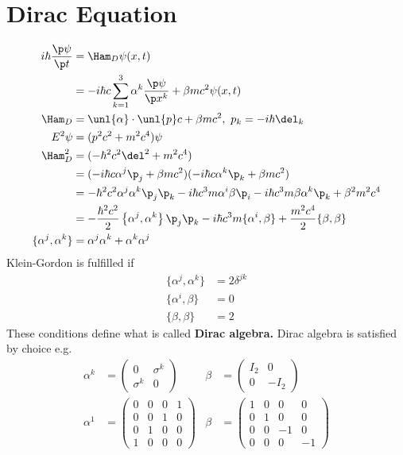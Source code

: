 \documentclass[a4paper, 11pt, normalem]{report}
\begin{document}
\section{Dirac Equation}
\begin{align}
    i\hbar\frac{\p\psi}{\p t} &= \Ham_D\psi(x,t) \\
                              &= -i\hbar c\sum_{k=1}^3 \alpha^k\frac{\p\psi}{\p x^k} + \beta mc^2\psi(x,t) \\
    \Ham_D &= \unl{\alpha}\cdot\unl{p}c + \beta mc^2,~ p_k = -i\hbar\del_k \\
    E^2\psi &= (p^2c^2 + m^2c^4)\psi \\
    \Ham_D^2 &= (-\hbar^2c^2\del^2 + m^2c^4) \\
             &= (-i\hbar c\alpha^j\p_j + \beta mc^2)(-i\hbar c\alpha^k\p_k + \beta mc^2) \\
             &= -\hbar^2c^2\alpha^j\alpha^k\p_j\p_k - i\hbar c^3m\alpha^i\beta\p_i - i\hbar c^3m\beta\alpha^k\p_k + \beta^2m^2c^4 \\
             &= -\frac{\hbar^2c^2}{2}\left\{\alpha^j,\alpha^k\right\}\p_j\p_k - i\hbar c^3m\{\alpha^i,\beta\} + \frac{m^2c^4}{2}\{\beta,\beta\}  \\
    \{\alpha^j,\alpha^k\} &= \alpha^j\alpha^k + \alpha^k\alpha^j
\end{align}
Klein-Gordon is fulfilled if
\begin{align}
    \{\alpha^j,\alpha^k\} &= 2\delta^{jk} \\
    \{\alpha^i,\beta\} &= 0 \\
    \{\beta,\beta\} &= 2
\end{align}
These conditions define what is called \textbf{Dirac algebra.}
Dirac algebra is satisfied by choice e.g.
\begin{align}
    \alpha^k &= \begin{pmatrix} 0 & \sigma^k \\ \sigma^k & 0 \end{pmatrix} & \beta &= \begin{pmatrix} I_2 & 0 \\ 0 & -I_2\end{pmatrix} \\
    \alpha^1 &= \begin{pmatrix} 0 & 0 & 0 & 1 \\ 0 & 0 & 1 & 0 \\ 0 & 1 & 0 & 0 \\ 1 & 0 & 0 & 0 \end{pmatrix} & \beta &= \begin{pmatrix} 1 & 0 & 0 & 0 \\ 0 & 1 & 0 & 0 \\ 0 & 0 & -1 & 0 \\ 0 & 0 & 0 & -1 \end{pmatrix}
\end{align}
\end{document}
